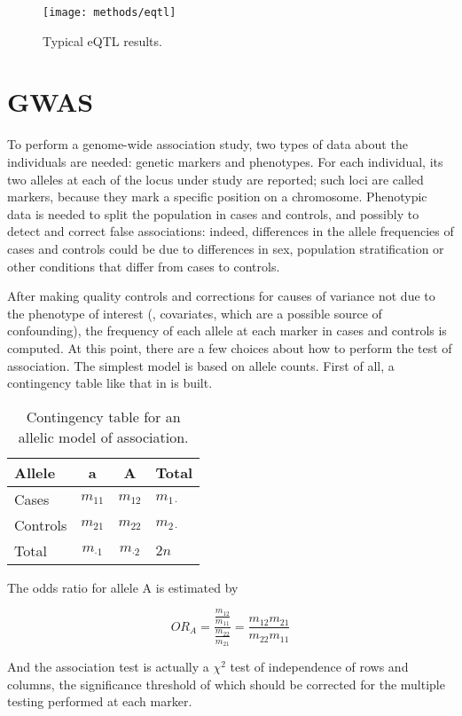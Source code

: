 \documentclass[../main.tex]{subfiles}
\begin{document}
\begin{figure}
	\texttt{[image: methods/eqtl]}
	\caption{Typical eQTL results.}
\end{figure}

\section{GWAS}

To perform a genome-wide association study\cite{Clarke2011}, two types 
of data about the individuals are needed: genetic markers and 
phenotypes. For each individual, its two alleles at each of the locus 
under study are reported; such loci are called markers, because they 
mark a specific position on a chromosome. Phenotypic data is needed to 
split the population in cases and controls, and possibly to detect and 
correct false associations: indeed, differences in the allele 
frequencies of cases and controls could be due to differences in sex, 
population stratification or other conditions that differ from cases to 
controls\cite{Price2006}.

After making quality controls and corrections for causes of variance not 
due to the phenotype of interest (\ie, covariates, which are a possible 
source of confounding), the frequency of each allele at each marker in 
cases and controls is computed. At this point, there are a few choices 
about how to perform the test of association. The simplest model is 
based on allele counts. First of all, a contingency table like that in 
 is built.

\begin{table}
	\begin{tabular}{ l c c l}
		\toprule
		Allele & a & A & Total \\
		\midrule
		Cases & $m_{11}$ & $m_{12}$ & $m_{1\cdot}$ \\
		Controls & $m_{21}$ & $m_{22}$ & $m_{2\cdot}$ \\
		Total & $m_{\cdot1}$ & $m_{\cdot2}$ & $2n$ \\
		\bottomrule
	\end{tabular}
	\caption{Contingency table for an allelic model of association.}
\end{table}

The odds ratio for allele A is estimated by

\begin{equation}
	OR_A = \frac{\frac{m_{12}}{m_{11}}}{\frac{m_{22}}{m_{21}}} =
		\frac{m_{12}m_{21}}{m_{22}m_{11}}
\end{equation}

And the association test is actually a $\chi^2$ test of independence of 
rows and columns, the significance threshold of which should be 
corrected for the multiple testing performed at each marker.

\end{document}
